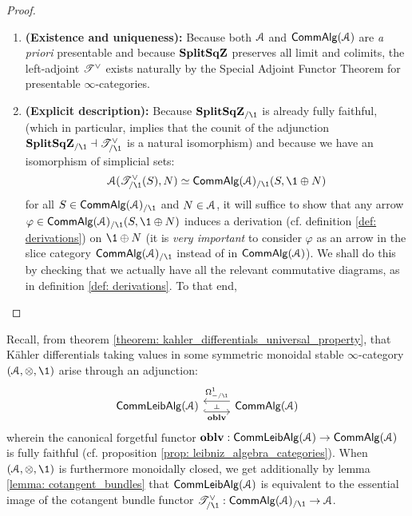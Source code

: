                     \begin{proof}
                        \noindent
                        \begin{enumerate}
                            \item \textbf{(Existence and uniqueness):} Because both $\mathcal{A}$ and $\mathsf{Comm}\mathsf{Alg}(\mathcal{A})$ are \textit{a priori} presentable and because $\mathbf{Split}\mathbf{Sq}\mathbf{Z}$ preserves all limit and colimits, the left-adjoint $\mathscr{T}^{\vee}$ exists naturally by the Special Adjoint Functor Theorem for presentable $\infty$-categories.
                            \item \textbf{(Explicit description):} Because $\Split\SqZ_{/\1}$ is already fully faithful, (which in particular, implies that the counit of the adjunction $\Split\SqZ_{/\1} \ladjoint \T^{\vee}_{/\1}$ is a natural isomorphism) and because we have an isomorphism of simplicial sets:
                                $$\calA(\T^{\vee}_{/\1}(S), N) \cong \Comm\Alg(\calA)_{/\1}(S, \1 \oplus N)$$
                            for all $S \in \Comm\Alg(\calA)_{/\1}$ and $N \in \mathcal{A}$, it will suffice to show that any arrow $\varphi \in \Comm\Alg(\calA)_{/\1}(S, \1 \oplus N)$ induces a derivation (cf. definition \ref{def: derivations}) on $\1 \oplus N$ (it is \textit{very important} to consider $\varphi$ as an arrow in the slice category $\Comm\Alg(\calA)_{/\1}$ instead of in $\mathsf{Comm}\mathsf{Alg}(\mathcal{A})$). We shall do this by checking that we actually have all the relevant commutative diagrams, as in definition \ref{def: derivations}. To that end, 
                        \end{enumerate}
                    \end{proof}
                \begin{remark} \label{remark: cotangent_bundles_and_kahler_differentials}
                    Recall, from theorem \ref{theorem: kahler_differentials_universal_property}, that K\"ahler differentials taking values in some symmetric monoidal stable $\infty$-category $(\calA, \tensor, \1)$ arise through an adjunction:
                        $$
                            \begin{tikzcd}
                            	{\Comm\Leib\Alg(\calA)} & {\Comm\Alg(\calA)}
                            	\arrow[""{name=0, anchor=center, inner sep=0}, "\oblv"', shift right=2, hook, from=1-1, to=1-2]
                            	\arrow[""{name=1, anchor=center, inner sep=0}, "{\Omega^1_{-/\1}}"', shift right=2, from=1-2, to=1-1]
                            	\arrow["\dashv"{anchor=center, rotate=-90}, draw=none, from=1, to=0]
                            \end{tikzcd}
                        $$
                    wherein the canonical forgetful functor $\mathbf{oblv}: \mathsf{Comm}\mathsf{Leib}\mathsf{Alg}(\mathcal{A}) \to \mathsf{Comm}\mathsf{Alg}(\mathcal{A})$ is fully faithful (cf. proposition \ref{prop: leibniz_algebra_categories}). When $(\calA, \tensor, \1)$ is furthermore monoidally closed, we get additionally by lemma \ref{lemma: cotangent_bundles} that $\mathsf{Comm}\mathsf{Leib}\mathsf{Alg}(\mathcal{A})$ is equivalent to the essential image of the cotangent bundle functor $\T^{\vee}_{/\1}: \Comm\Alg(\calA)_{/\1} \to \calA$. 
                \end{remark}
                
